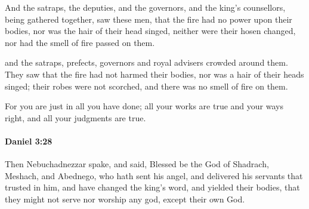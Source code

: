 			\begin{versebox}
					\item[BHS] 
					\item[LXX] 
					\item[ASV] And the satraps, the deputies, and the governors, and the king's counsellors, being gathered together, saw these men, that the fire had no power upon their bodies, nor was the hair of their head singed, neither were their hosen changed, nor had the smell of fire passed on them.
					\item[NIV] and the satraps, prefects, governors and royal advisers crowded around them. They saw that the fire had not harmed their bodies, nor was a hair of their heads singed; their robes were not scorched, and there was no smell of fire on them.
					\item[NRSV] For you are just in all you have done; all your works are true and your ways right, and all your judgments are true.
			\end{versebox}

		\paragraph{Daniel 3:28} %
			\label{DANIEL-3-28}

			Then Nebuchadnezzar spake, and said, Blessed be the God of Shadrach, Meshach, and Abednego, who hath sent his angel, and delivered his servants that trusted in him, and have changed the king’s word, and yielded their bodies, that they might not serve nor worship any god, except their own God.

